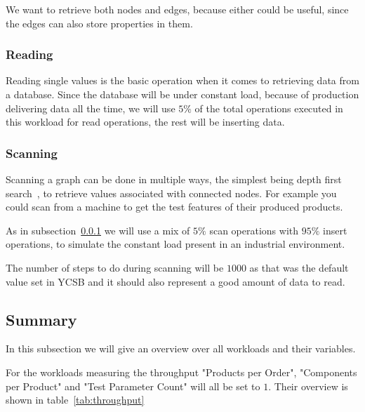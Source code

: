 We want to retrieve both nodes and edges,
because either could be useful,
since the edges can also store properties in them.

\subsubsection{Reading}
\label{ch:design:se:reading}
Reading single values is the basic operation when it comes to retrieving data from a database.
Since the database will be under constant load,
because of production delivering data all the time,
we will use $ 5\% $ of the total operations executed in this workload for read operations,
the rest will be inserting data.

\subsubsection{Scanning}
\label{ch:design:se:scanning}
Scanning a graph can be done in multiple ways,
the simplest being depth first search~\cite{Tarjan1972},
to retrieve values associated with connected nodes.
For example you could scan from a machine to get the test features of their produced products.

As in subsection~\ref{ch:design:se:reading} we will use a mix of $ 5\% $ scan operations with $ 95\% $ insert operations,
to simulate the constant load present in an industrial environment.

The number of steps to do during scanning will be $ 1000 $ as that was the default value set in YCSB and it should also represent a good amount of data to read.

\subsection{Summary}
\label{ch:design:se:summary}
In this subsection we will give an overview over all workloads and their variables.

For the workloads measuring the throughput "Products per Order",
"Components per Product" and "Test Parameter Count" will all be set to $ 1 $.
Their overview is shown in table~\ref{tab:throughput}

